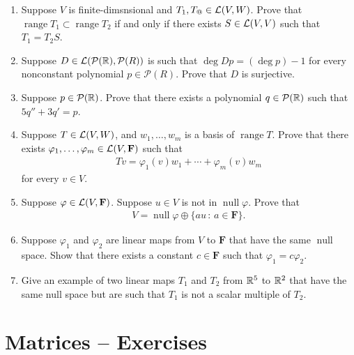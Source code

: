 \documentclass[10pt,a4paper]{report}
\DeclareMathOperator{\RANGE}{range}
\DeclareMathOperator{\NULL}{null}
\newcommand{\F}{\textbf{F}}
\begin{document}
\begin{enumerate}
\item Suppose $V$ is finite-dimsnsional and $T_1,T_@ \in \mathcal{L}(V,W)$.  Prove that $\RANGE T_1\subset \RANGE T_2$ if and only if there exists $S \in \mathcal{L}(V,V)$ such that $T_1=T_2S$.

\item Suppose $D \in \mathcal{L}(\mathcal{P}(\mathbb{R}), \mathcal{P}(R))$ is such that $\deg Dp=(\deg p) -1$ for every nonconstant polynomial $ p \in \mathcal{P}(R)$.  Prove that $D$ is surjective.

\item Suppose $ p \in \mathcal{P}(\mathbb{R})$.  Prove that there exists a polynomial $q \in \mathcal{P}(\mathbb{R})$ such that $5q''+3q'=p$.

\item Suppose $T \in\mathcal{L}(V,W)$, and $w_1,\dots,w_m$ is a basis of $\RANGE T$.  Prove that there exists $\varphi_1,\dots,\varphi_m \in \LL(V, \F)$ such that 
\begin{align*}
	Tv=\varphi_1(v)w_1+\cdots+\varphi_m(v)w_m
\end{align*}for every $v \in V$.

\item Suppose $\varphi\in\LL(V,\F)$.  Suppose $u \in V$ is not in $\NULL \varphi$.  Prove that 
\begin{align*}
	V = \NULL \varphi \oplus \{au \,:\,a \in \F\}.
\end{align*}

\item Suppose $\varphi_1$ and $\varphi_2$ are linear maps from $V$ to $\F$ that have the same $\NULL$ space.  Show that there exists a constant $c \in \F$ such that $\varphi_1=c \varphi_2$.

\item Give an example of two linear maps $T_1$ and $T_2$ from $\mathbb{R}^5$ to $\mathbb{R}^2$ that have the same null space but are such that $T_1$ is not a scalar multiple of $T_2$.

\end{enumerate}

\section{Matrices -- Exercises}
\end{document}
